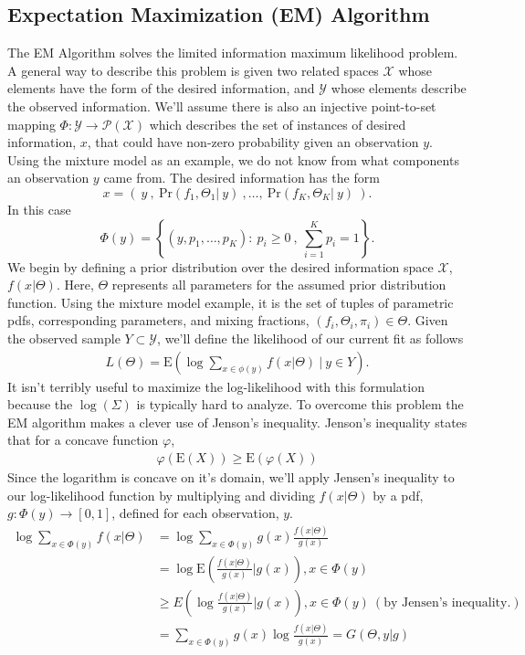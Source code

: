 \documentclass[10pt,a4paper]{article}
\newcommand{\given}{\vert}
\begin{document}
\subsection{Expectation Maximization (EM) Algorithm}
The EM Algorithm solves the limited information maximum likelihood problem. A general way to describe this problem is given two related spaces $\mathcal{X}$ whose elements have the form of the desired information, and $\mathcal{Y}$ whose elements describe the observed information. We'll assume there is also an injective point-to-set mapping $\Phi: \mathcal{Y} \rightarrow \mathcal{P}(\mathcal{X}) $ which describes the set of instances of desired information, $x$, that could have non-zero probability given an observation $y$. Using the mixture model as an example, we do not know from what components an observation $y$ came from. The desired information has the form $$x = \left( ~ y ~ , ~ \text{Pr}( f_1, \Theta_1 \given ~ y )~,\ldots ,~\text{Pr}( f_K, \Theta_K \given ~ y )~\right).$$
In this case $$\Phi(y) = \left\{ ( y , p_1 , \ldots , p_K ) : ~p_i \geq 0~,~ \sum_{i=1}^K p_i = 1\right\}.$$
We begin by defining a prior distribution over the desired information space $\mathcal{X}$, $f(x|\Theta)$. Here, $\Theta$ represents all parameters for the assumed prior distribution function. Using the mixture model example, it is the set of tuples of parametric pdfs, corresponding parameters, and mixing fractions, $(f_i, \Theta_i, \pi_i) \in \Theta$. Given the observed sample $Y \subset \mathcal{Y}$, we'll define the likelihood of our current fit as follows
\begin{align}
L(\Theta) = \text{E}\left(\log\sum_{x \in \phi(y)} f(x \given \Theta) ~\bigg\given~y \in Y \right).
\end{align} 
It isn't terribly useful to maximize the log-likelihood with this formulation because the $\log(\Sigma)$ is typically hard to analyze. To overcome this problem the EM algorithm makes a clever use of Jenson's inequality. Jenson's inequality states that for a concave function $\varphi$, 
\begin{align}
\varphi(\text{E}(X)) \geq \text{E}(\varphi(X))
\end{align}
Since the logarithm is concave on it's domain, we'll apply Jensen's inequality to our log-likelihood function by multiplying and dividing $f(x \given \Theta)$ by a pdf, $g: \Phi(y) \rightarrow [0,1]$, defined for each observation, $y$.
\begin{align}
\log \sum_{x \in \Phi(y)} f(x \given \Theta) &= \log \sum_{x \in \Phi(y)} g(x)\frac{ f(x \given \Theta) }{g(x)}\\
&= \log \text{E}\left( \frac{ f(x \given \Theta) }{g(x)} \bigg\given g(x)\right), x \in \Phi(y)\\
&\geq E\left( \log \frac{ f(x \given \Theta) }{g(x)} \bigg\given g(x)\right), x \in \Phi(y) ~(\text{by Jensen's inequality.})\\
&= \sum_{x \in \Phi(y)} g(x) \log \frac{ f(x \given \Theta) }{g(x)} = G(\Theta, y \given g)
\end{align}
\end{document}
